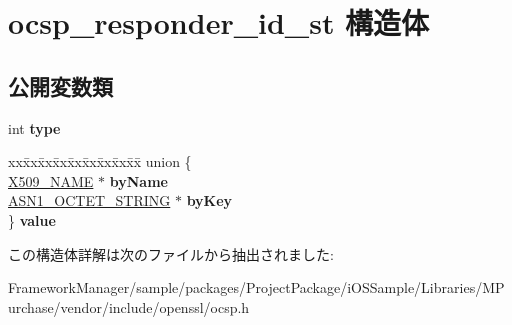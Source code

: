 \hypertarget{structocsp__responder__id__st}{}\section{ocsp\+\_\+responder\+\_\+id\+\_\+st 構造体}
\label{structocsp__responder__id__st}
\subsection*{公開変数類}
\begin{DoxyCompactItemize}
\item 
\hypertarget{structocsp__responder__id__st_a77bb04f705903d3d2e8c3b5671d6adc6}{}int {\bfseries type}\label{structocsp__responder__id__st_a77bb04f705903d3d2e8c3b5671d6adc6}

\item 
\hypertarget{structocsp__responder__id__st_a6d77682c7879c098dcb894c306d0f565}{}\begin{tabbing}
xx\=xx\=xx\=xx\=xx\=xx\=xx\=xx\=xx\=\kill
union \{\\
\>\hyperlink{struct_x509__name__st}{X509\_NAME} $\ast$ {\bfseries byName}\\
\>\hyperlink{structasn1__string__st}{ASN1\_OCTET\_STRING} $\ast$ {\bfseries byKey}\\
\} {\bfseries value}\label{structocsp__responder__id__st_a6d77682c7879c098dcb894c306d0f565}
\\

\end{tabbing}\end{DoxyCompactItemize}


この構造体詳解は次のファイルから抽出されました\+:\begin{DoxyCompactItemize}
\item 
Framework\+Manager/sample/packages/\+Project\+Package/i\+O\+S\+Sample/\+Libraries/\+M\+Purchase/vendor/include/openssl/ocsp.\+h\end{DoxyCompactItemize}
